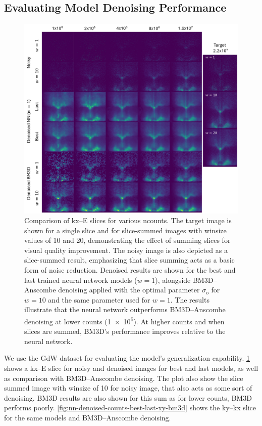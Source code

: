 \subsection{Evaluating Model Denoising Performance}
\begin{figure}
    \centering
    \includegraphics[width=1\linewidth]{images/nn_denoised_counts_best_last_ex_bm3d.pdf}
    \caption{Comparison of \gls{kx}–\gls{E} slices for various \gls{ncounts}. The target image is shown for a single slice and for slice-summed images with \gls{winsize} values of \num{10} and \num{20}, demonstrating the effect of summing slices for visual quality improvement. The noisy image is also depicted as a slice-summed result, emphasizing that slice summing acts as a basic form of noise reduction. Denoised results are shown for the best and last trained neural network models ($w=1$), alongside \gls{BM3D}–Anscombe denoising applied with the optimal parameter $\sigma_{\text{o}}$ for $w=10$ and the same parameter used for $w=1$. The results illustrate that the neural network outperforms BM3D–Anscombe denoising at lower counts (\num{1e6}). At higher counts and when slices are summed, BM3D’s performance improves relative to the neural network.}
    \label{fig:nn-denoised-counts-best-last-ex-bm3d}
\end{figure}

We use the \gls{GdW} dataset for evaluating the model's generalization capability. \cref{fig:nn-denoised-counts-best-last-ex-bm3d} shows a \gls{kx}--\gls{E} slice for noisy and denoised images for best and last models, as well as comparison with \gls{BM3D}--Anscombe denoising. The plot also show the slice summed image with \gls{winsize} of \num{10} for noisy image, that also acts as some sort of denoising. BM3D results are also shown for this sum as for lower counts, BM3D performs poorly. \cref{fig:nn-denoised-counts-best-last-xy-bm3d} shows the \gls{ky}--\gls{kx} slice for the same models and \gls{BM3D}--Anscombe denoising.

